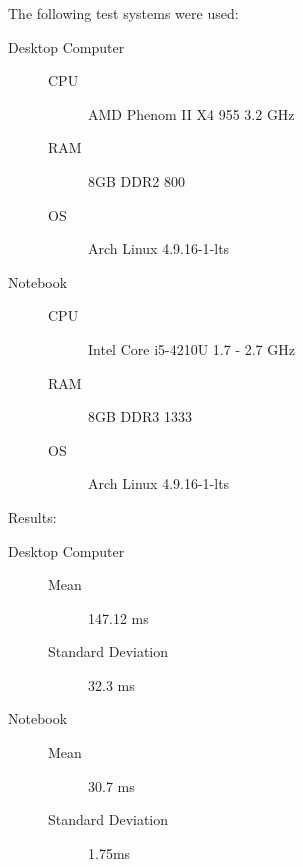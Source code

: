 \documentclass[11pt,oneside,openright]{mpreport}
\begin{document}
The following test systems were used:
\begin{description}
\item[Desktop Computer]\hfill
\begin{description}
\item[CPU] AMD Phenom II X4 955 3.2 GHz
\item[RAM] 8GB DDR2 800
\item[OS] Arch Linux 4.9.16-1-lts
\end{description}
\item[Notebook]\hfill
\begin{description}
\item[CPU] Intel Core i5-4210U 1.7 - 2.7 GHz
\item[RAM] 8GB DDR3 1333
\item[OS] Arch Linux 4.9.16-1-lts
\end{description}
\end{description}

Results:

\begin{description}
\item[Desktop Computer]\hfill
\begin{description}
\item[Mean] 147.12 ms
\item[Standard Deviation] 32.3 ms
\end{description}
\item[Notebook]\hfill
\begin{description}
\item[Mean] 30.7 ms
\item[Standard Deviation] 1.75ms
\end{description}
\end{description}
\end{document}
